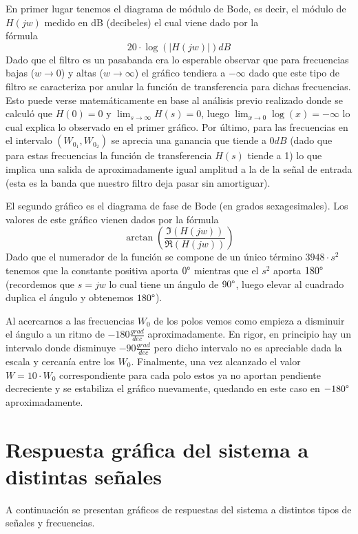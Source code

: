 \documentclass[11pt,a4paper]{report}
\begin{document}
\newpage
En primer lugar tenemos el diagrama de módulo de Bode, es decir, el módulo de 
$H(jw)$ medido en dB (decibeles) el cual viene dado por la\\ fórmula
\[20 \cdot \log(|H(jw)|) dB\]
Dado que el filtro es un pasabanda era lo esperable
observar que para frecuencias bajas ($w\longrightarrow0$) y altas ($w\longrightarrow\infty$) el gráfico tendiera a $-\infty$ dado que este tipo de
filtro se caracteriza por anular la función de transferencia para dichas frecuencias.
Esto puede verse matemáticamente en base al análisis previo realizado donde se calculó que $H(0) = 0$ y $\lim_{s \to \infty} H(s) = 0$, luego 
$\lim_{x \to 0} \log(x) = -\infty$ lo cual explica lo observado en el primer gráfico.
Por último, para las frecuencias en el intervalo $(W_{0_{1}}, W_{0_{2}})$ se aprecia una ganancia que tiende a $0dB$ (dado que para estas frecuencias la función de transferencia $H(s)$ tiende a 1) lo que implica una salida de aproximadamente igual amplitud a la de
la señal de entrada (esta es la banda que nuestro filtro deja pasar sin amortiguar).

\bigskip
El segundo gráfico es el diagrama de fase de Bode (en grados sexagesimales). 
Los valores de este gráfico vienen dados por la fórmula 
\[\arctan(\frac{\Im(H(jw))}{\Re(H(jw))})\]
Dado que el numerador de la función se compone de un único término $3948 \cdot s^2$ 
tenemos que la constante positiva aporta $0\degree$ mientras que el $s^2$ aporta
$180\degree$ (recordemos que $s=jw$ lo cual tiene un ángulo de $90\degree$, luego elevar al cuadrado duplica el ángulo y obtenemos $180\degree$).

\bigskip
Al acercarnos a las frecuencias $W_{0}$ de los polos vemos como empieza a disminuir el ángulo a un ritmo de $-180 \frac{grad}{dec}$ aproximadamente. En rigor, en principio hay un intervalo donde disminuye $-90 \frac{grad}{dec}$ pero dicho intervalo no es apreciable dada la escala y cercanía entre los $W_{0}$. 
Finalmente, una vez alcanzado el valor $W=10 \cdot W_{0}$ correspondiente para cada polo estos ya no aportan
pendiente decreciente y se estabiliza el gráfico nuevamente, quedando en este caso
en $-180\degree$ aproximadamente.

\newpage
\section*{Respuesta gráfica del sistema a distintas señales}

A continuación se presentan gráficos de respuestas del sistema a distintos tipos
de señales y frecuencias.
\end{document}
